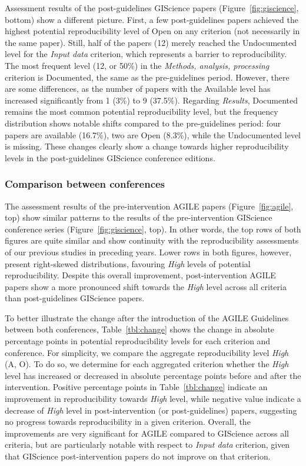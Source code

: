 \documentclass{josis}
\begin{document}
Assessment results of the post-guidelines GIScience papers (Figure~\ref{fig:giscience}, bottom) show a different picture. 
First, a few post-guidelines papers achieved the highest potential reproducibility level of Open on any criterion (not necessarily in the same paper).
Still, half of the papers (12) merely reached the Undocumented level for the \textit{Input data} criterion, which represents a barrier to reproducibility.
The most frequent level (12, or 50\%) in the \textit{Methods, analysis, processing} criterion is Documented, the same as the pre-guidelines period.
However, there are some differences, as the number of papers with the Available level has increased significantly from 1 (3\%) to 9 (37.5\%).
Regarding \textit{Results}, Documented remains the most common potential reproducibility level, but the frequency distribution shows notable shifts compared to the pre-guidelines period: four papers are available (16.7\%), two are Open (8.3\%), while the Undocumented level is missing.
These changes clearly show a change towards higher reproducibility levels in the post-guidelines GIScience conference editions.


\subsubsection{Comparison between conferences}

The assessment results of the pre-intervention AGILE papers (Figure~\ref{fig:agile}, top) show similar patterns to the results of the pre-intervention GIScience conference series (Figure~\ref{fig:giscience}, top). In other words, the top rows of both figures are quite similar and show continuity with the reproducibility assessments of our previous studies in preceding years. Lower rows in both figures, however, present right-skewed distributions, favouring \textit{High} levels of potential reproducibility. Despite this overall improvement, post-intervention AGILE papers show a more pronounced shift towards the \textit{High} level across all criteria than post-guidelines GIScience papers.

To better illustrate the change after the introduction of the AGILE Guidelines between both conferences, Table~\ref{tbl:change} shows the change in absolute percentage points in potential reproducibility levels for each criterion and conference. 
For simplicity, we compare the aggregate reproducibility level \textit{High} (A, O).  
To do so, we determine for each aggregated criterion whether the \textit{High} level has increased or decreased in absolute percentage points before and after the intervention. 
Positive percentage points in Table~\ref{tbl:change} indicate an improvement in reproducibility towards \textit{High} level, while negative value indicate a decrease of \textit{High} level in post-intervention (or post-guidelines) papers, suggesting no progress towards reproducibility in a given criterion. 
Overall, the improvements are very significant for AGILE compared to GIScience across all criteria, but are particularly notable with respect to \textit{Input data} criterion, given that GIScience post-intervention papers do not improve on that criterion.
\end{document}
